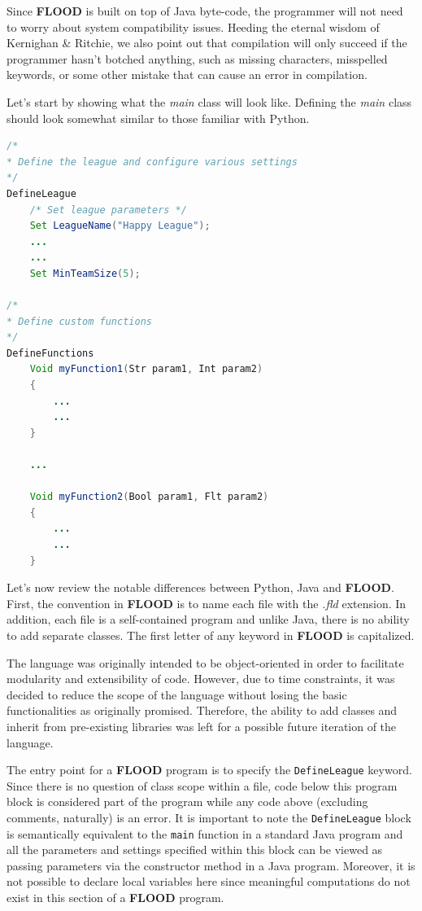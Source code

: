 \documentclass[12pt]{report}
\begin{document}
Since \textbf{FLOOD} is built on top of Java byte-code, the programmer will not need to worry about system compatibility issues. Heeding the eternal wisdom of Kernighan \& Ritchie, we also point out that compilation will only succeed if the programmer hasn't botched anything, such as missing characters, misspelled keywords, or some other mistake that can cause an error in compilation. 

Let's start by showing what the \textit{main} class will look like. Defining the \textit{main} class should look somewhat similar to those familiar with Python.

\begin{singlespace}
\begin{lstlisting}[language=Java,label=some-code,caption=Sample.fld]
/*
* Define the league and configure various settings
*/
DefineLeague
	/* Set league parameters */
	Set LeagueName("Happy League");
	...
	...
	Set MinTeamSize(5);

/*
* Define custom functions
*/
DefineFunctions
	Void myFunction1(Str param1, Int param2)
	{
		...
		...
	}

	...

	Void myFunction2(Bool param1, Flt param2)
	{
		...
		...
	}
\end{lstlisting}
\end{singlespace}

Let's now review the notable differences between Python, Java and \textbf{FLOOD}. First,  the convention in \textbf{FLOOD} is to name each file with the \textit{.fld} extension. In addition, each file is a self-contained program and unlike Java, there is no ability to add separate classes. The first letter of any keyword in \textbf{FLOOD} is capitalized.

The language was originally intended to be object-oriented in order to facilitate modularity and extensibility of code. However, due to time constraints, it was decided to reduce the scope of the language without losing the basic functionalities as originally promised. Therefore, the ability to add classes and inherit from pre-existing libraries was left for a possible future iteration of the language. 

The entry point for a \textbf{FLOOD} program is to specify the \texttt{DefineLeague} keyword. Since there is no question of class scope within a file, code below this program block is considered part of the program while any code above (excluding comments, naturally) is an error. It is important to note the \texttt{DefineLeague} block is semantically equivalent to the \texttt{main} function in a standard Java program and all the parameters and settings specified within this block can be viewed as passing parameters via the constructor method in a Java program. Moreover, it is not possible to declare local variables here since meaningful computations do not exist in this section of a \textbf{FLOOD} program. 
\end{document}
